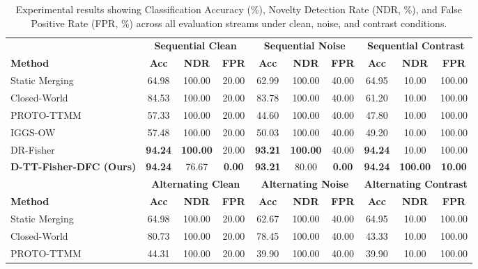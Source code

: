 \documentclass{article}
\theoremstyle{plain}
\theoremstyle{definition}
\theoremstyle{remark}
\begin{document}
\begin{table}[t]
\caption{Experimental results showing Classification Accuracy (\%), Novelty Detection Rate (NDR, \%), and False Positive Rate (FPR, \%) across all evaluation streams under clean, noise, and contrast conditions.}
\label{tab:results}
\vskip 0.15in
\begin{center}
\begin{small}
\begin{tabular}{l|ccc|ccc|ccc}
\toprule
& \multicolumn{3}{c|}{\textbf{Sequential Clean}} & \multicolumn{3}{c|}{\textbf{Sequential Noise}} & \multicolumn{3}{c}{\textbf{Sequential Contrast}} \\
\textbf{Method} & \textbf{Acc} & \textbf{NDR} & \textbf{FPR} & \textbf{Acc} & \textbf{NDR} & \textbf{FPR} & \textbf{Acc} & \textbf{NDR} & \textbf{FPR} \\
\midrule
Static Merging & 64.98 & 100.00 & 20.00 & 62.99 & 100.00 & 40.00 & 64.95 & 10.00 & 100.00 \\
Closed-World & 84.53 & 100.00 & 20.00 & 83.78 & 100.00 & 40.00 & 61.20 & 10.00 & 100.00 \\
PROTO-TTMM \cite{proto_ttmm} & 57.33 & 100.00 & 20.00 & 44.60 & 100.00 & 40.00 & 47.80 & 10.00 & 100.00 \\
IGGS-OW \cite{iggs_ow} & 57.48 & 100.00 & 20.00 & 50.03 & 100.00 & 40.00 & 49.20 & 10.00 & 100.00 \\
DR-Fisher \cite{dr_fisher} & \textbf{94.24} & \textbf{100.00} & 20.00 & \textbf{93.21} & \textbf{100.00} & 40.00 & \textbf{94.24} & 10.00 & 100.00 \\
\textbf{D-TT-Fisher-DFC (Ours)} & \textbf{94.24} & 76.67 & \textbf{0.00} & \textbf{93.21} & 80.00 & \textbf{0.00} & \textbf{94.24} & \textbf{100.00} & \textbf{10.00} \\
\midrule
& \multicolumn{3}{c|}{\textbf{Alternating Clean}} & \multicolumn{3}{c|}{\textbf{Alternating Noise}} & \multicolumn{3}{c}{\textbf{Alternating Contrast}} \\
\textbf{Method} & \textbf{Acc} & \textbf{NDR} & \textbf{FPR} & \textbf{Acc} & \textbf{NDR} & \textbf{FPR} & \textbf{Acc} & \textbf{NDR} & \textbf{FPR} \\
\midrule
Static Merging & 64.98 & 100.00 & 20.00 & 62.67 & 100.00 & 40.00 & 64.95 & 10.00 & 100.00 \\
Closed-World & 80.73 & 100.00 & 20.00 & 78.45 & 100.00 & 40.00 & 43.33 & 10.00 & 100.00 \\
PROTO-TTMM \cite{proto_ttmm} & 44.31 & 100.00 & 20.00 & 39.90 & 100.00 & 40.00 & 39.90 & 10.00 & 100.00 \\

\end{tabular}
\end{small}
\end{center}
\end{table}
\end{document}
